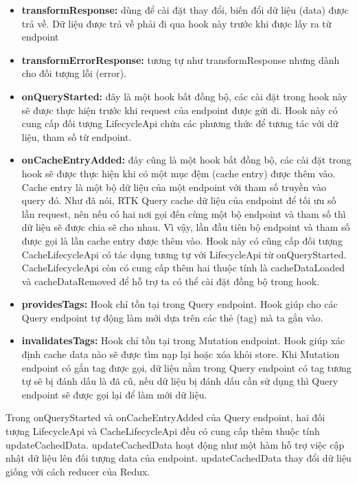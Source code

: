 \begin{itemize}
  \item \textbf{transformResponse:} dùng để cài đặt thay đổi, biến đổi dữ liệu (data) được trả về.
  Dữ liệu được trả về phải đi qua hook này trước khi được lấy ra từ endpoint
  \item \textbf{transformErrorResponse:} tương tự như transformResponse nhưng dành cho đối tượng lỗi (error).
  \item \textbf{onQueryStarted:} đây là một hook bất đồng bộ, các cài đặt trong hook này sẽ được thực hiện trước khi request của endpoint được gửi đi. Hook này có cung cấp đối tượng LifecycleApi chứa các phương thức để tương tác với dữ liệu, tham số từ endpoint.
  \item \textbf{onCacheEntryAdded:} đây cũng là một hook bất đồng bộ, các cài đặt trong hook sẽ được thực hiện khi có một mục đệm (cache entry) được thêm vào.
  Cache entry là một bộ dữ liệu của một endpoint với tham số truyền vào query đó.
  Như đã nói, RTK Query cache dữ liệu của endpoint để tối ưu số lần request, nên nếu có hai nơi gọi đến cùng một bộ endpoint và tham số thì dữ liệu sẽ được chia sẽ cho nhau.
  Vì vậy, lần đầu tiên bộ endpoint và tham số được gọi là lần cache entry được thêm vào.
  Hook này có cũng cấp đối tượng CacheLifecycleApi có tác dụng tương tự với LifecycleApi từ onQueryStarted.
  CacheLifecycleApi còn có cung cấp thêm hai thuộc tính là cacheDataLoaded và cacheDataRemoved để hỗ trợ ta có thể cài đặt đồng bộ trong hook.
  \item \textbf{providesTags:} Hook chỉ tồn tại trong Query endpoint.
  Hook giúp cho các Query endpoint tự động làm mới dựa trên các thẻ (tag) mà ta gắn vào.
  \item \textbf{invalidatesTags:} Hook chỉ tồn tại trong Mutation endpoint.
  Hook giúp xác định cache data nào sẽ được tìm nạp lại hoặc xóa khỏi store.
  Khi Mutation endpoint có gắn tag được gọi, dữ liệu nằm trong Query endpoint có tag tương tự sẽ bị đánh dấu là đã cũ, nếu dữ liệu bị đánh dấu cần sử dụng thì Query endpoint sẽ được gọi lại để làm mới dữ liệu.
\end{itemize}

Trong onQueryStarted và onCacheEntryAdded của Query endpoint, hai đối tượng LifecycleApi và CacheLifecycleApi đều có cung cấp thêm thuộc tính updateCachedData.
updateCachedData hoạt động như một hàm hỗ trợ việc cập nhật dữ liệu lên đối tượng data của endpoint.
updateCachedData thay đổi dữ liệu giống với cách reducer của Redux.
\par

